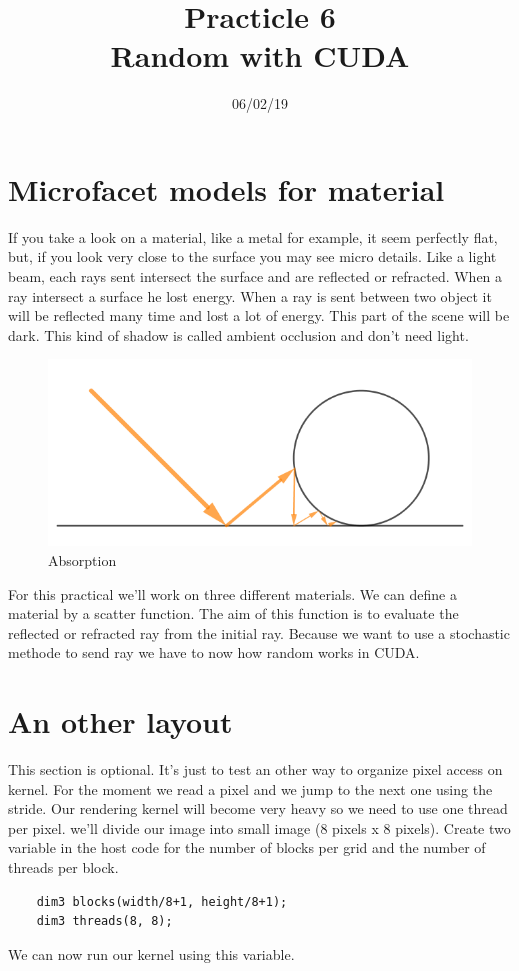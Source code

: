 \documentclass{article}
\begin{document}
\title{Practicle 6\\Random with CUDA}
\date{06/02/19}
\maketitle

\begin{abstract}
	
\end{abstract}

\section{Microfacet models for material}
If you take a look on a material, like a metal for example, it seem perfectly flat, but, if you look very close to the surface you may see micro details. Like a light beam, each rays sent intersect the surface and are reflected or refracted. When a ray intersect a surface he lost energy. When a ray is sent between two object it will be reflected many time and lost a lot of energy. This part of the scene will be dark. This kind of shadow is called ambient occlusion and don't need light.

\begin{figure}[h]
	\centering
	\includegraphics[scale=0.47]{figures/absorption.png}
	\caption{Absorption}
\end{figure}

For this practical we'll work on three different materials. We can define a material by a scatter function. The aim of this function is to evaluate the reflected or refracted ray from the initial ray. Because we want to use a stochastic methode to send ray we have to now how random works in CUDA.

\section{An other layout}
This section is optional. It's just to test an other way to organize pixel access on kernel. For the moment we read a pixel and we jump to the next one using the stride. Our rendering kernel will become very heavy so we need to use one thread per pixel. we'll divide our image into small image (8 pixels x 8 pixels). Create two variable in the host code for the number of blocks per grid and the number of threads per block.
\begin{lstlisting}
	dim3 blocks(width/8+1, height/8+1);
	dim3 threads(8, 8);
\end{lstlisting}
We can now run our kernel using this variable.
\end{document}
